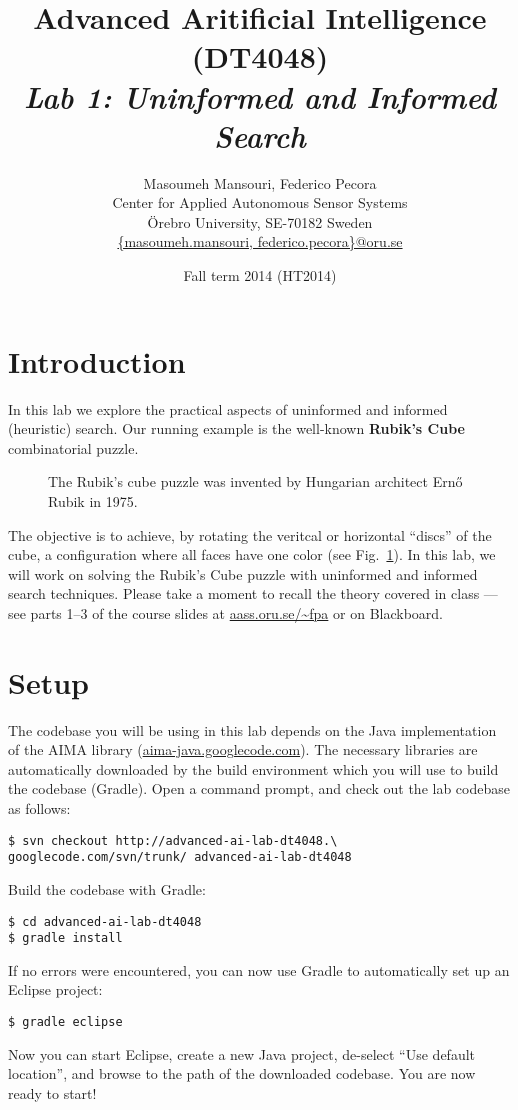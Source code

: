 \documentclass[a4paper]{article}
\title{Advanced Aritificial Intelligence (DT4048)\\{\em Lab 1: Uninformed and Informed Search}}
\author{Masoumeh Mansouri, Federico Pecora\\Center for Applied Autonomous Sensor Systems\\\"Orebro University, SE-70182 Sweden\\\url{{masoumeh.mansouri, federico.pecora}@oru.se}}
\date{Fall term 2014 (HT2014)}
\begin{document}
\maketitle

\section{Introduction}

In this lab we explore the practical aspects of uninformed and informed (heuristic) search.  Our running example is the well-known {\bf Rubik's Cube} combinatorial puzzle.
\begin{figure}[!ht]
\centering

\caption{{\small The Rubik's cube puzzle was invented by Hungarian architect Ern\H{o} Rubik in 1975.}}
\label{fig:rc}
\end{figure}
The objective is to achieve, by rotating the veritcal or horizontal ``discs'' of the cube, a configuration where all faces have one color (see Fig.~\ref{fig:rc}).  In this lab, we will work on solving the Rubik's Cube puzzle with uninformed and informed search techniques.  Please take a moment to recall the theory covered in class --- see parts 1--3 of the course slides at \url{aass.oru.se/~fpa} or on Blackboard.

\section{Setup}
The codebase you will be using in this lab depends on the Java implementation of the AIMA library (\url{aima-java.googlecode.com}).  The necessary libraries are automatically downloaded by the build environment which you will use to build the codebase (Gradle).  Open a command prompt, and check out the lab codebase as follows:
\begin{verbatim}
$ svn checkout http://advanced-ai-lab-dt4048.\
googlecode.com/svn/trunk/ advanced-ai-lab-dt4048
\end{verbatim}
Build the codebase with Gradle:
\begin{verbatim}
$ cd advanced-ai-lab-dt4048
$ gradle install
\end{verbatim}
If no errors were encountered, you can now use Gradle to automatically set up an Eclipse project:
\begin{verbatim}
$ gradle eclipse
\end{verbatim}
Now you can start Eclipse, create a new Java project, de-select ``Use default location'', and browse to the path of the downloaded codebase. You are now ready to start!
\end{document}
